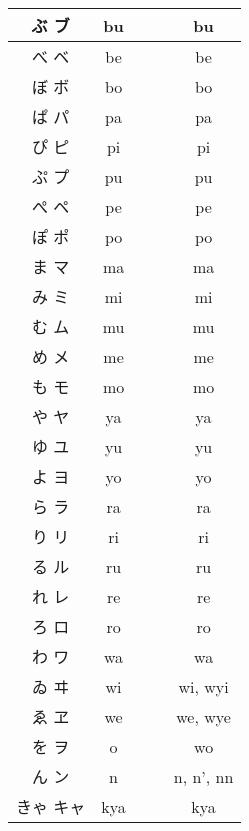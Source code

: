 \documentclass{article}
\begin{document}
\begin{center}
\begin{japanese}
\begin{longtable}{|c|c c c|c|}
                ぶ ブ & bu &&& bu \\ \hline
                べ ベ & be &&& be \\ \hline
                ぼ ボ & bo &&& bo \\ \hline
                ぱ パ & pa &&& pa \\ \hline
                ぴ ピ & pi &&& pi \\ \hline
                ぷ プ & pu &&& pu \\ \hline
                ぺ ペ & pe &&& pe \\ \hline
                ぽ ポ & po &&& po \\ \hline
                ま マ & ma &&& ma \\ \hline
                み ミ & mi &&& mi \\ \hline
                む ム & mu &&& mu \\ \hline
                め メ & me &&& me \\ \hline
                も モ & mo &&& mo \\ \hline
                や ヤ & ya &&& ya \\ \hline
                ゆ ユ & yu &&& yu \\ \hline
                よ ヨ & yo &&& yo \\ \hline
                ら ラ & ra &&& ra \\ \hline
                り リ & ri &&& ri \\ \hline
                る ル & ru &&& ru \\ \hline
                れ レ & re &&& re \\ \hline
                ろ ロ & ro &&& ro \\ \hline
                わ ワ & wa &&& wa \\ \hline
                ゐ ヰ & wi &&& wi, wyi \\ \hline
                ゑ ヱ & we &&& we, wye \\ \hline
                を ヲ & o &&& wo \\ \hline
                ん ン & n &&& n, n', nn \\ \hline
                きゃ キャ & kya &&& kya \\ \hline

\end{longtable}
\end{japanese}
\end{center}
\end{document}
